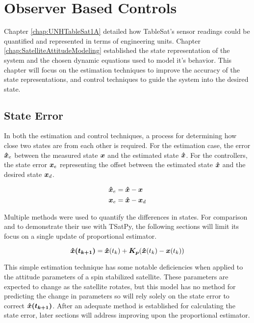 
\chapter{Observer Based Controls}
\label{chap:ObserverBasedControls}

Chapter \ref{chap:UNHTableSat1A} detailed how TableSat's sensor readings could be quantified and represented in terms of engineering units.  Chapter \ref{chap:SatelliteAttitudeModeling} established the state representation of the system and the chosen dynamic equations used to model it's behavior.  This chapter will focus on the estimation techniques to improve the accuracy of the state representations, and control techniques to guide the system into the desired state.

\section{State Error}
\label{sec:StateError}

In both the estimation and control techniques, a process for determining how close two states are from each other is required.  For the estimation case,  the error $\boldsymbol{\hat{x}}_e$ between the measured state $\boldsymbol{x}$ and the estimated state $\boldsymbol{\hat{x}}$.  For the controllers, the state error $\boldsymbol{x}_e$ representing the offset between the estimated state $\boldsymbol{\hat{x}}$ and the desired state $\boldsymbol{x}_d$.

\begin{subequations}
  \begin{align}
    \boldsymbol{\hat{x}}_e &= \boldsymbol{\hat{x}} - \boldsymbol{x} \\
    \boldsymbol{x}_e &= \boldsymbol{\hat{x}} - \boldsymbol{x}_d
  \end{align}
  \label{eqn:StateError}
\end{subequations}

Multiple methods were used to quantify the differences in states.  For comparison and to demonstrate their use with TSatPy, the following sections will limit its focus on a single update of proportional estimator.

\begin{equation}
  \boldsymbol{\hat{x}(t_{k+1})} = \boldsymbol{\hat{x}}(t_{k}) + \boldsymbol{K_p} ( \boldsymbol{\hat{x}}(t_{k}) - \boldsymbol{x}(t_{k}) )
  \label{eqn:PEstimatorStateDiff}
\end{equation}

This simple estimation technique has some notable deficiencies when applied to the attitude parameters of a spin stabilized satellite.  These parameters are expected to change as the satellite rotates, but this model has no method for predicting the change in parameters so will rely solely on the state error to correct $\boldsymbol{\hat{x}(t_{k+1})}$.  After an adequate method is established for calculating the state error, later sections will address improving upon the proportional estimator.

